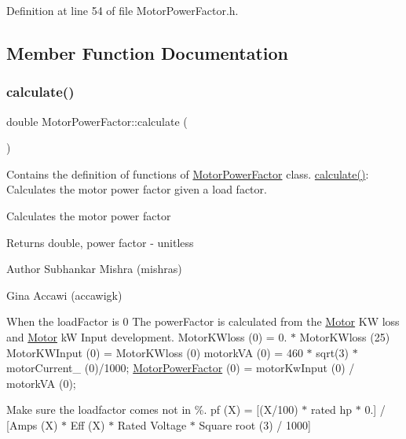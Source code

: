 Definition at line 54 of file Motor\+Power\+Factor.\+h.



\subsection{Member Function Documentation}
\mbox{\label{class_motor_power_factor_ac9d5742db4a371bc4e15d5b29d335b6e}} 
\subsubsection{\texorpdfstring{calculate()}{calculate()}\hspace{0.1cm}{\footnotesize\ttfamily [1/3]}}
{\footnotesize\ttfamily double Motor\+Power\+Factor\+::calculate (\begin{DoxyParamCaption}{ }\end{DoxyParamCaption})}



Contains the definition of functions of \hyperlink{class_motor_power_factor}{Motor\+Power\+Factor} class. \hyperlink{class_motor_power_factor_ac9d5742db4a371bc4e15d5b29d335b6e}{calculate()}\+: Calculates the motor power factor given a load factor. 

Calculates the motor power factor \begin{DoxyReturn}{Returns}
double, power factor -\/ unitless
\end{DoxyReturn}
\begin{DoxyAuthor}{Author}
Subhankar Mishra (mishras) 

Gina Accawi (accawigk) 
\end{DoxyAuthor}
When the load\+Factor is 0 The power\+Factor is calculated from the \hyperlink{struct_motor}{Motor} KW loss and \hyperlink{struct_motor}{Motor} kW Input development. Motor\+K\+Wloss (0) = 0. $\ast$ Motor\+K\+Wloss (25) Motor\+K\+W\+Input (0) = Motor\+K\+Wloss (0) motork\+VA (0) = 460 $\ast$ sqrt(3) $\ast$ motor\+Current\+\_\+ (0)/1000; \hyperlink{class_motor_power_factor}{Motor\+Power\+Factor} (0) = motor\+Kw\+Input (0) / motork\+VA (0);

Make sure the loadfactor comes not in \%. pf (X) = \mbox{[}(X/100) $\ast$ rated hp $\ast$ 0.\mbox{]} / \mbox{[}Amps (X) $\ast$ Eff (X) $\ast$ Rated Voltage $\ast$ Square root (3) / 1000\mbox{]}

